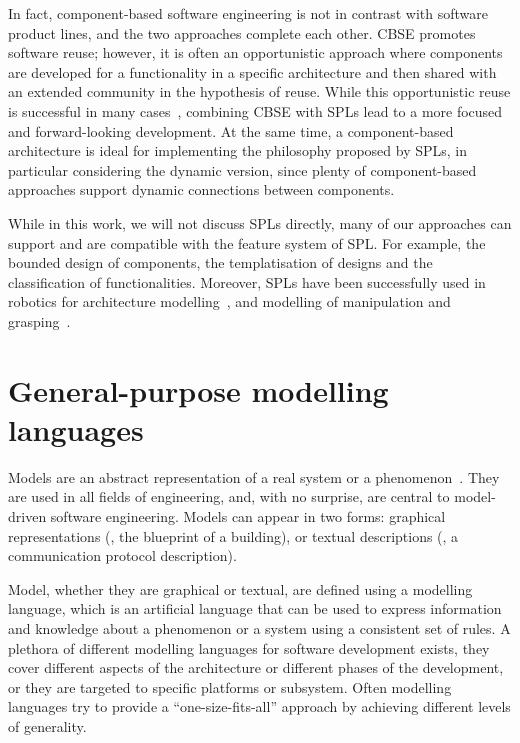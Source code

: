 In fact, component-based software engineering is not in contrast with software product lines, and the two approaches complete each other. CBSE promotes software reuse; however, it is often an opportunistic approach where components are developed for a functionality in a specific architecture and then shared with an extended community in the hypothesis of reuse. While this opportunistic reuse is successful in many cases~\cite{jansen2008pragmatic}, combining CBSE with SPLs lead to a more focused and forward-looking development. At the same time, a component-based architecture is ideal for implementing the philosophy proposed by SPLs, in particular considering the dynamic version, since plenty of component-based approaches support dynamic connections between components.

While in this work, we will not discuss SPLs directly, many of our approaches can support and are compatible with the feature system of SPL. For example, the bounded design of components, the templatisation of designs and the classification of functionalities. Moreover, SPLs have been successfully used in robotics for architecture modelling~\cite{gherardi2014modeling, brugali2016hyperflex}, and modelling of manipulation and grasping~\cite{baumgartl2013towards}.
 
\section[General-purpose modelling languages]{General-purpose modelling\\languages}
Models are an abstract representation of a real system or a phenomenon~\cite{schichl2004models}. They are used in all fields of engineering, and, with no surprise, are central to model-driven software engineering. Models can appear in two forms: graphical representations (\eg, the blueprint of a building), or textual descriptions (\eg, a communication protocol description). 

Model, whether they are graphical or textual, are defined using a modelling language, which is an artificial language that can be used to express information and knowledge about a phenomenon or a system using a consistent set of rules. A plethora of different modelling languages for software development exists, they cover different aspects of the architecture or different phases of the development, or they are targeted to specific platforms or subsystem. Often modelling languages try to provide a ``one-size-fits-all'' approach by achieving different levels of generality.

